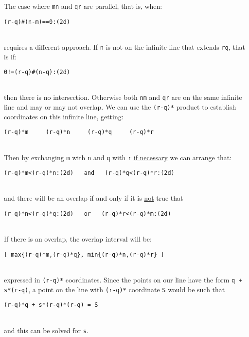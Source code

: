 \documentclass[12pt]{article}
\begin{document}
The case where {\tt mn} and {\tt qr} are parallel, that is, when: \\
\centerline{{\tt (r-q)\#(n-m)==0:(2d)}} \\
requires a different approach.  If {\tt n} is not on the infinite
line that extends {\tt rq}, that is if: \\
\centerline{{\tt 0!=(r-q)\#(n-q):(2d)}} \\
then there is no intersection.  Otherwise both {\tt nm} and {\tt qr}
are on the same infinite line and may or may not overlap.
We can use the {\tt (r-q)*} product to establish coordinates on this
infinite line, getting: \\
\centerline{\tt (r-q)*m ~~~ (r-q)*n ~~~ (r-q)*q ~~~ (r-q)*r} \\
Then by exchanging {\tt m} with {\tt n} and {\tt q} with {\tt r}
\underline{if necessary} we can arrange that: \\
\centerline{\tt (r-q)*m<(r-q)*n:(2d) ~ and ~ (r-q)*q<(r-q)*r:(2d)} \\
and there will be an overlap if and only if it is \underline{not}
true that \\
\centerline{\tt (r-q)*n<(r-q)*q:(2d) ~ or ~ (r-q)*r<(r-q)*m:(2d)} \\
If there is an overlap, the overlap interval will be: \\
\centerline{\tt [ max\{(r-q)*m,(r-q)*q\}, min\{(r-q)*n,(r-q)*r\} ]} \\
expressed in {\tt (r-q)*} coordinates.  Since the points on our
line have the form {\tt q + s*(r-q)}, a point on the line with
{\tt (r-q)*} coordinate {\tt S} would be such that \\
\centerline{\tt (r-q)*q + s*(r-q)*(r-q) = S} \\
and this can be solved for {\tt s}.

\newpage
\end{document}
